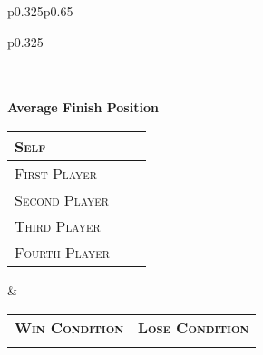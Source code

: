 \documentclass{article}
\begin{document}
\begin{tabular}{p{}p{}}
\begin{tabular}{p{}}
\begin{tikzpicture}
      		\filldraw[fill=MarzDarkRed] (\fpeval{((\averageTurnNumber-\offset)/\steps) - 0.5} cm,-1.5 cm) circle (3pt);
		\end{tikzpicture}
		\\\\
		\Large{\textbf{Average Finish Position}}\\
		\calculateFourPlayerAverageFinishPositions{\logbook}
		\hspace*{0.5cm}\begin{tabular}{|p{}c|r|}
			\hline
			\textsc{Self} && \averageSelfFinishPosition \\\hline
			\textsc{First Player} && \averageFirstPlayerFinish \\\hline
			\textsc{Second Player} && \averageSecondPlayerFinish \\\hline
			\textsc{Third Player} && \averageThirdPlayerFinish \\\hline
			\textsc{Fourth Player} && \averageFourthPlayerFinish \\\hline
		\end{tabular}
	\end{tabular}
	&
	\def\informationradius{2}
	\begin{tabular}{m{}m{}}
		\large{\textbf{\textsc{Win Condition}}} & \large{\textbf{\textsc{Lose Condition}}}
		\\
		\calculateWinConditionsPercentages{\logbook}{WIN}%
		\begin{tikzpicture}%
			\pie[explode=0.05, text=legend, radius=\informationradius, color={MarzDarkRed, MarzPurple, MarzRoyal, MarzOrange, MarzGold}, before number=\printonlypositive, after number=, at={(0, 0)}]{%
				\hpopercentage/Hit Points 0,
				\poisonpercentage/Poison,
				\deckoutpercentage/Deck-Out,
				\cardeffectpercentage/Card Effect,
				\commanderdamagepercentage/ Commander Damage
			}%
			\node at (-2.25,2.25) {};%
			\node at (-2.25,-2.25) {};%
		\end{tikzpicture}%
		&
		\calculateWinConditionsPercentages{\logbook}{LOSE}%
		\begin{tikzpicture}%
			\pie[explode=0.05, text=legend, radius=\informationradius, color={MarzDarkRed, MarzPurple, MarzRoyal, MarzOrange, MarzGold}, before number=\printonlypositive, after number=,]{%
				\hpopercentage/Hit Points 0,
				\poisonpercentage/Poison,
				\deckoutpercentage/Deck-Out,
				\cardeffectpercentage/Card Effect,
				\commanderdamagepercentage/ Commander Damage
			}%
			\node at (-2.25,2.25) {};%
			\node at (-2.25,-2.25) {};%
		\end{tikzpicture}%

\end{tabular}
\end{tabular}
\end{document}

